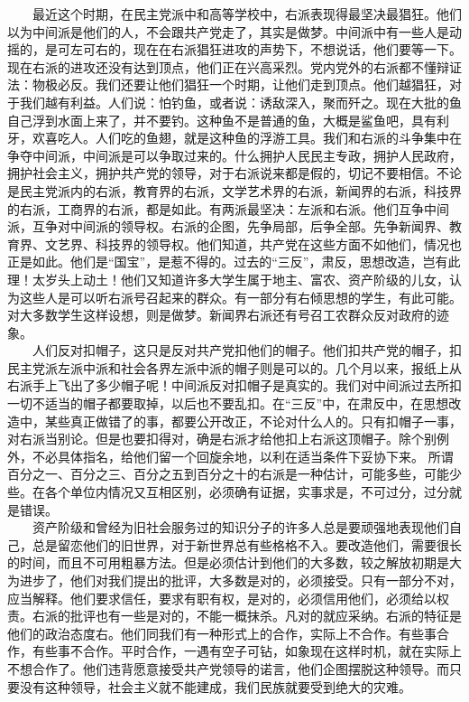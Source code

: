 \documentclass[cn,11pt,chinese]{elegantbook}
\begin{document}
　　最近这个时期，在民主党派中和高等学校中，右派表现得最坚决最猖狂。他们以为中间派是他们的人，不会跟共产党走了，其实是做梦。中间派中有一些人是动摇的，是可左可右的，现在在右派猖狂进攻的声势下，不想说话，他们要等一下。现在右派的进攻还没有达到顶点，他们正在兴高采烈。党内党外的右派都不懂辩证法：物极必反。我们还要让他们猖狂一个时期，让他们走到顶点。他们越猖狂，对于我们越有利益。人们说：怕钓鱼，或者说：诱敌深入，聚而歼之。现在大批的鱼自己浮到水面上来了，并不要钓。这种鱼不是普通的鱼，大概是鲨鱼吧，具有利牙，欢喜吃人。人们吃的鱼翅，就是这种鱼的浮游工具。我们和右派的斗争集中在争夺中间派，中间派是可以争取过来的。什么拥护人民民主专政，拥护人民政府，拥护社会主义，拥护共产党的领导，对于右派说来都是假的，切记不要相信。不论是民主党派内的右派，教育界的右派，文学艺术界的右派，新闻界的右派，科技界的右派，工商界的右派，都是如此。有两派最坚决：左派和右派。他们互争中间派，互争对中间派的领导权。右派的企图，先争局部，后争全部。先争新闻界、教育界、文艺界、科技界的领导权。他们知道，共产党在这些方面不如他们，情况也正是如此。他们是“国宝”，是惹不得的。过去的“三反”，肃反，思想改造，岂有此理！太岁头上动土！他们又知道许多大学生属于地主、富农、资产阶级的儿女，认为这些人是可以听右派号召起来的群众。有一部分有右倾思想的学生，有此可能。对大多数学生这样设想，则是做梦。新闻界右派还有号召工农群众反对政府的迹象。\\
　　人们反对扣帽子，这只是反对共产党扣他们的帽子。他们扣共产党的帽子，扣民主党派左派中派和社会各界左派中派的帽子则是可以的。几个月以来，报纸上从右派手上飞出了多少帽子呢！中间派反对扣帽子是真实的。我们对中间派过去所扣一切不适当的帽子都要取掉，以后也不要乱扣。在“三反”中，在肃反中，在思想改造中，某些真正做错了的事，都要公开改正，不论对什么人的。只有扣帽子一事，对右派当别论。但是也要扣得对，确是右派才给他扣上右派这顶帽子。除个别例外，不必具体指名，给他们留一个回旋余地，以利在适当条件下妥协下来。 所谓百分之一、百分之三、百分之五到百分之十的右派是一种估计，可能多些，可能少些。在各个单位内情况又互相区别，必须确有证据，实事求是，不可过分，过分就是错误。\\
　　资产阶级和曾经为旧社会服务过的知识分子的许多人总是要顽强地表现他们自己，总是留恋他们的旧世界，对于新世界总有些格格不入。要改造他们，需要很长的时间，而且不可用粗暴方法。但是必须估计到他们的大多数，较之解放初期是大为进步了，他们对我们提出的批评，大多数是对的，必须接受。只有一部分不对，应当解释。他们要求信任，要求有职有权，是对的，必须信用他们，必须给以权责。右派的批评也有一些是对的，不能一概抹杀。凡对的就应采纳。右派的特征是他们的政治态度右。他们同我们有一种形式上的合作，实际上不合作。有些事合作，有些事不合作。平时合作，一遇有空子可钻，如象现在这样时机，就在实际上不想合作了。他们违背愿意接受共产党领导的诺言，他们企图摆脱这种领导。而只要没有这种领导，社会主义就不能建成，我们民族就要受到绝大的灾难。\\
\end{document}
